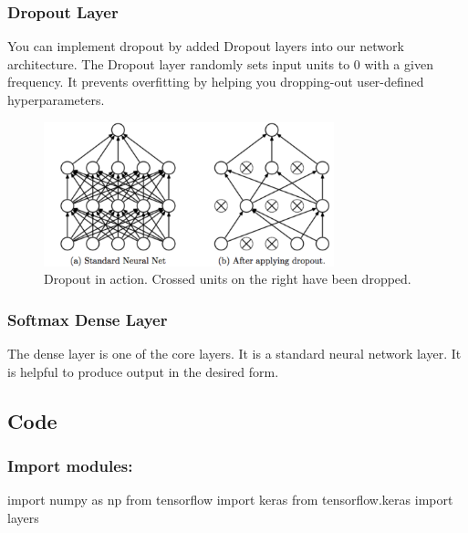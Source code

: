 \documentclass[12pt]{article}
\theoremstyle{mytheoremstyle}
\theoremstyle{mytheoremstyle}
\theoremstyle{myproblemstyle}
\begin{document}
    \subsubsection{Dropout Layer}
    You can implement dropout by added Dropout layers into our network architecture. The Dropout layer randomly sets input units to 0 with a given frequency. It prevents overfitting by helping you dropping-out user-defined hyperparameters. 

    \begin{figure}[H]
      \centering
      \includegraphics[width=0.75\textwidth]{images/dropout.png}
      \caption{Dropout in action. Crossed units on the right have been dropped.}
    \end{figure}

    \subsubsection{Softmax Dense Layer}
    The dense layer is one of the core layers. It is a standard neural network layer. It is helpful to produce output in the desired form.
    
  \subsection{Code}
  
    \subsubsection{Import modules:}
    \begin{python}
      import numpy as np
      from tensorflow import keras
      from tensorflow.keras import layers
    \end{python}
\end{document}
